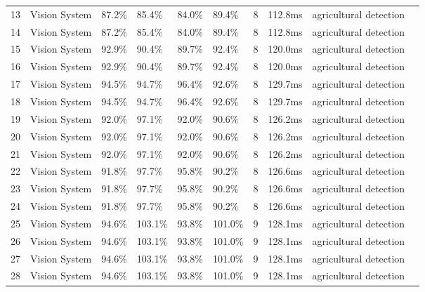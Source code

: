 \begin{table*}[htbp]
\begin{tabular}{p{}p{}p{}p{}p{}p{}p{}p{}p{}p{}}
 13 & Vision System & 87.2\% & 85.4\% & 84.0\% & 89.4\% & 8 & 112.8ms & agricultural detection & \cite{chen2015design} \\
 14 & Vision System & 87.2\% & 85.4\% & 84.0\% & 89.4\% & 8 & 112.8ms & agricultural detection & \cite{gao2015reconfigurable} \\
 15 & Vision System & 92.9\% & 90.4\% & 89.7\% & 92.4\% & 8 & 120.0ms & agricultural detection & \cite{li2016reconfigurable} \\
 16 & Vision System & 92.9\% & 90.4\% & 89.7\% & 92.4\% & 8 & 120.0ms & agricultural detection & \cite{wang2016design} \\
 17 & Vision System & 94.5\% & 94.7\% & 96.4\% & 92.6\% & 8 & 129.7ms & agricultural detection & \cite{zhang2017reconfigurable} \\
 18 & Vision System & 94.5\% & 94.7\% & 96.4\% & 92.6\% & 8 & 129.7ms & agricultural detection & \cite{chen2017design} \\
 19 & Vision System & 92.0\% & 97.1\% & 92.0\% & 90.6\% & 8 & 126.2ms & agricultural detection & \cite{li2018reconfigurable} \\
 20 & Vision System & 92.0\% & 97.1\% & 92.0\% & 90.6\% & 8 & 126.2ms & agricultural detection & \cite{wang2018design} \\
 21 & Vision System & 92.0\% & 97.1\% & 92.0\% & 90.6\% & 8 & 126.2ms & agricultural detection & \cite{zhang2018reconfigurable} \\
 22 & Vision System & 91.8\% & 97.7\% & 95.8\% & 90.2\% & 8 & 126.6ms & agricultural detection & \cite{chen2019design} \\
 23 & Vision System & 91.8\% & 97.7\% & 95.8\% & 90.2\% & 8 & 126.6ms & agricultural detection & \cite{li2019reconfigurable} \\
 24 & Vision System & 91.8\% & 97.7\% & 95.8\% & 90.2\% & 8 & 126.6ms & agricultural detection & \cite{wang2019design} \\
 25 & Vision System & 94.6\% & 103.1\% & 93.8\% & 101.0\% & 9 & 128.1ms & agricultural detection & \cite{zhang2020reconfigurable} \\
 26 & Vision System & 94.6\% & 103.1\% & 93.8\% & 101.0\% & 9 & 128.1ms & agricultural detection & \cite{chen2020design} \\
 27 & Vision System & 94.6\% & 103.1\% & 93.8\% & 101.0\% & 9 & 128.1ms & agricultural detection & \cite{li2020reconfigurable} \\
 28 & Vision System & 94.6\% & 103.1\% & 93.8\% & 101.0\% & 9 & 128.1ms & agricultural detection & \cite{wang2020design} \\

\end{tabular}
\end{table*}
